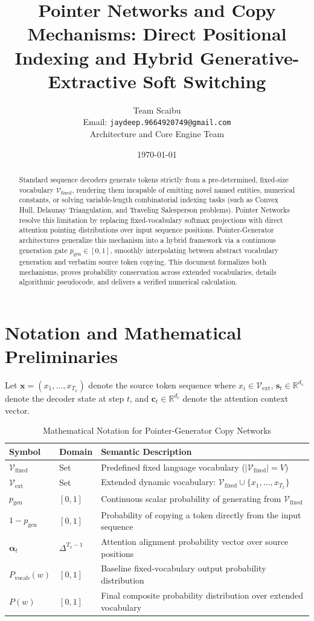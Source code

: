 \documentclass[11pt,a4paper]{article}
\title{Pointer Networks and Copy Mechanisms: Direct Positional Indexing and Hybrid Generative-Extractive Soft Switching}
\author{Team Scaibu \\ \small Email: \texttt{jaydeep.9664920749@gmail.com} \\ \small Architecture and Core Engine Team}
\date{\today}
\theoremstyle{definition}
\begin{document}
\maketitle

\begin{abstract}
Standard sequence decoders generate tokens strictly from a pre-determined, fixed-size vocabulary $\mathcal{V}_{\text{fixed}}$, rendering them incapable of emitting novel named entities, numerical constants, or solving variable-length combinatorial indexing tasks (such as Convex Hull, Delaunay Triangulation, and Traveling Salesperson problems). Pointer Networks resolve this limitation by replacing fixed-vocabulary softmax projections with direct attention pointing distributions over input sequence positions. Pointer-Generator architectures generalize this mechanism into a hybrid framework via a continuous generation gate $p_{\text{gen}} \in [0, 1]$, smoothly interpolating between abstract vocabulary generation and verbatim source token copying. This document formalizes both mechanisms, proves probability conservation across extended vocabularies, details algorithmic pseudocode, and delivers a verified numerical calculation.
\end{abstract}

\section{Notation and Mathematical Preliminaries}

Let $\mathbf{x} = (x_1, \dots, x_{T_x})$ denote the source token sequence where $x_i \in \mathcal{V}_{\text{ext}}$, $\mathbf{s}_t \in \mathbb{R}^{d_s}$ denote the decoder state at step $t$, and $\mathbf{c}_t \in \mathbb{R}^{d_c}$ denote the attention context vector.

\begin{table}[h]
\centering
\caption{Mathematical Notation for Pointer-Generator Copy Networks}
\begin{tabular}{lll}
\toprule
\textbf{Symbol} & \textbf{Domain} & \textbf{Semantic Description} \\
\midrule
$\mathcal{V}_{\text{fixed}}$ & Set & Predefined fixed language vocabulary ($|\mathcal{V}_{\text{fixed}}| = V$) \\
$\mathcal{V}_{\text{ext}}$ & Set & Extended dynamic vocabulary: $\mathcal{V}_{\text{fixed}} \cup \{x_1, \dots, x_{T_x}\}$ \\
$p_{\text{gen}}$ & $[0, 1]$ & Continuous scalar probability of generating from $\mathcal{V}_{\text{fixed}}$ \\
$1 - p_{\text{gen}}$ & $[0, 1]$ & Probability of copying a token directly from the input sequence \\
$\boldsymbol{\alpha}_t$ & $\Delta^{T_x - 1}$ & Attention alignment probability vector over source positions \\
$P_{\text{vocab}}(w)$ & $[0, 1]$ & Baseline fixed-vocabulary output probability distribution \\
$P(w)$ & $[0, 1]$ & Final composite probability distribution over extended vocabulary \\
\bottomrule
\end{tabular}
\end{table}
\end{document}
